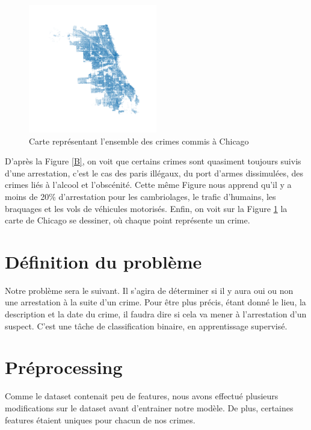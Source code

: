 \documentclass{article}
\begin{document}
    \begin{figure}
	    \centering
	    \includegraphics[width=0.5\textwidth]{images/carte_chicago.png}
	    \caption{Carte représentant l'ensemble des crimes commis à Chicago}
	    \label{C}
    \end{figure}

    D'après la Figure \ref{B}, on voit que certains crimes sont quasiment toujours suivis 
    d'une arrestation, c'est le cas des paris illégaux, du port d'armes dissimulées, 
    des crimes liés à l'alcool et l'obscénité.
    Cette même Figure nous apprend qu'il y a moins de 20\% d'arrestation pour les 
    cambriolages, le trafic d'humains, les braquages et les vols de véhicules motorisés.
    Enfin, on voit sur la Figure \ref{C} la carte de Chicago se dessiner, où chaque
    point représente un crime.

    \section{Définition du problème}
    Notre problème sera le suivant. Il s'agira de déterminer si il y aura
    oui ou non une arrestation à la suite d'un crime. 
    Pour être plus précis, étant donné le lieu, la description et la date du crime, 
    il faudra dire si cela va mener à l'arrestation d'un suspect.
    C'est une tâche de classification
    binaire, en apprentissage supervisé.

    \section{Préprocessing}
    Comme le dataset contenait peu de features, 
    nous avons effectué plusieurs modifications sur le dataset 
    avant d'entrainer notre modèle.
    De plus, certaines features étaient uniques pour chacun de nos crimes.
\end{document}
